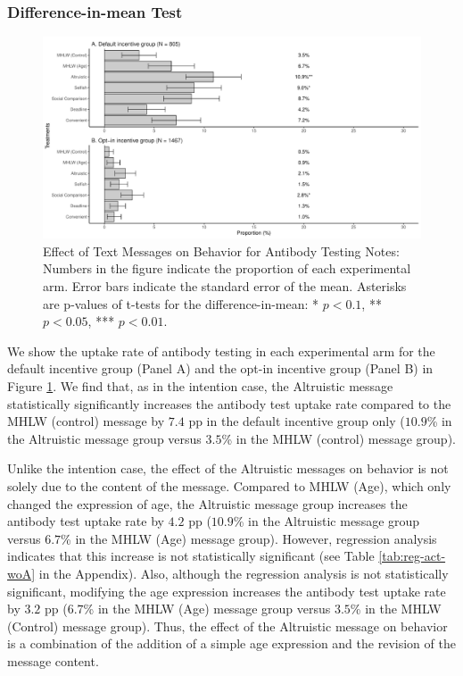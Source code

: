 \documentclass[
]{article}
\begin{document}
\hypertarget{difference-in-mean-test-1}{%
\subsubsection{Difference-in-mean Test}\label{difference-in-mean-test-1}}

\begin{figure}[t]
\includegraphics{discussion-paper_files/figure-latex/ttest-act-test-1} \caption{Effect of Text Messages on Behavior for Antibody Testing Notes: Numbers in the figure indicate the proportion of each experimental arm. Error bars indicate the standard error of the mean. Asterisks are p-values of t-tests for the difference-in-mean: * $p < 0.1$, ** $p < 0.05$, *** $p < 0.01$.}\label{fig:ttest-act-test}
\end{figure}

We show the uptake rate of antibody testing in each experimental arm for the default incentive group (Panel A) and the opt-in incentive group (Panel B) in Figure \ref{fig:ttest-act-test}. We find that, as in the intention case, the Altruistic message statistically significantly increases the antibody test uptake rate compared to the MHLW (control) message by \(7.4\) pp in the default incentive group only (\(10.9\)\% in the Altruistic message group versus \(3.5\)\% in the MHLW (control) message group).

Unlike the intention case, the effect of the Altruistic messages on behavior is not solely due to the content of the message. Compared to MHLW (Age), which only changed the expression of age, the Altruistic message group increases the antibody test uptake rate by \(4.2\) pp (\(10.9\)\% in the Altruistic message group versus \(6.7\)\% in the MHLW (Age) message group). However, regression analysis indicates that this increase is not statistically significant (see Table \ref{tab:reg-act-woA} in the Appendix). Also, although the regression analysis is not statistically significant, modifying the age expression increases the antibody test uptake rate by \(3.2\) pp (\(6.7\)\% in the MHLW (Age) message group versus \(3.5\)\% in the MHLW (Control) message group). Thus, the effect of the Altruistic message on behavior is a combination of the addition of a simple age expression and the revision of the message content.
\end{document}

